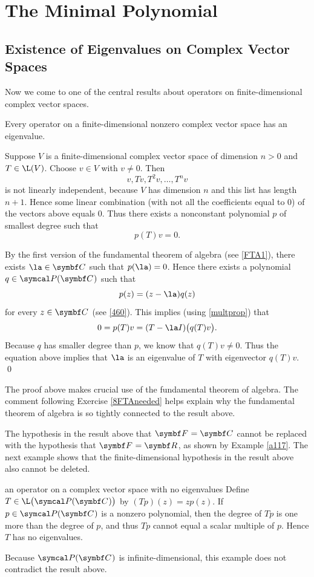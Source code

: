 \section{The Minimal Polynomial}
\label{eigenuppertri}

\subsection{Existence of Eigenvalues on Complex Vector Spaces}

Now we come to one of the central results about operators on finite-dimensional complex vector spaces.

{Every operator on a finite-dimensional nonzero complex vector space  has an eigenvalue.}

\proof
Suppose $V$ is a finite-dimensional complex vector space of dimension $n > 0$ and $T \in \L(V)$.
Choose $v \in V$ with $v \ne 0$. Then
\[
v, Tv,T^2 v, \dots , T^n v
\]
is not linearly independent, because $V$ has dimension $n$ and this list has length $n+1$. Hence some linear combination (with not all the coefficients equal to $0$) of the vectors above equals $0$. Thus there exists a nonconstant polynomial $p$ of smallest degree such that
\[
p(T)v = 0.
\]

By the first version of the fundamental theorem of algebra (see \ref{FTA1}), there exists $\la \in \C{}$ such that $p(\la) = 0$. Hence there exists a polynomial $q \in \P(\C{})$ such that
\[
p(z) = (z-\la) q(z)
\]
for every $z \in \C{}$ (see \ref{460}). This implies (using \ref{multprop}) that
\[
0 = p(T)v = (T - \la I) \bigl( q(T)v \bigl).
\]
Because $q$ has smaller degree than $p$, we know that $q(T)v \ne 0$. Thus the equation above implies that $\la$ is an eigenvalue of $T$ with eigenvector $q(T)v$.
\qed

The proof above makes crucial use of the fundamental theorem of algebra. The comment following Exercise \ref{8FTAneeded} helps explain why the fundamental theorem of algebra is so tightly connected to the result above.

The hypothesis in the result above that $\F{} = \C{}$ cannot be replaced with the hypothesis that $\F{} = \R{}$, as shown by Example \ref{a117}. The next example shows that the finite-dimensional hypothesis in the result above also cannot be deleted.

\begin{example}{an operator on a complex vector space with no eigenvalues}
Define $T \in \L\paren[\big]{ \P(\C{}) }$ by
$
(Tp)(z) = z p(z)$.
If $p \in \P(\C{})$ is a nonzero poly\-nomial, then the degree of $Tp$ is one more than the degree of $p$, and thus $Tp$ cannot equal a scalar multiple of $p$. Hence $T$ has no eigenvalues.

Because $\P(\C{})$ is infinite-dimensional, this example does not contradict the result above.
\end{example}

